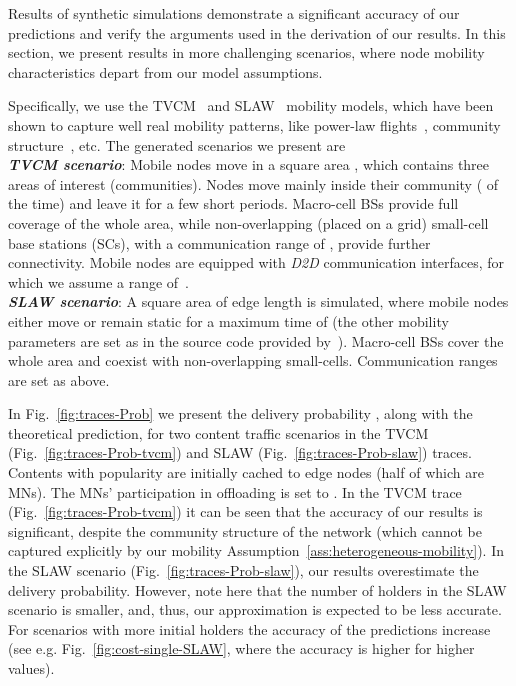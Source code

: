 \documentclass[10pt,conference,letterpaper]{IEEEtran}
\begin{document}
Results of synthetic simulations demonstrate a significant accuracy of our predictions and verify the arguments used in the derivation of our results. In this section, we present results in more challenging scenarios, where node mobility characteristics depart from our model assumptions.

Specifically, we use the TVCM~\cite{tvcm} and SLAW~\cite{slaw} mobility models, which have been shown to capture well real mobility patterns, like power-law flights~\cite{slaw}, community structure~\cite{tvcm}, etc. The generated scenarios we present are\\
\noindent\textit{\textbf{TVCM scenario}}: Mobile nodes move in a square area , which contains three areas of interest (communities). Nodes move mainly inside their community ( of the time) and leave it for a few short periods. Macro-cell BSs provide full coverage of the whole area, while  non-overlapping (placed on a grid) small-cell base stations (SCs), with a communication range of , provide further connectivity. Mobile nodes are equipped with \textit{D2D} communication interfaces, for which we assume a range of~.\\
\textit{\textbf{SLAW scenario}}: A square area of edge length  is simulated, where mobile nodes either move or remain static for a maximum time of  (the other mobility parameters are set as in the source code provided by~\cite{slaw}). Macro-cell BSs cover the whole area and coexist with  non-overlapping small-cells. Communication ranges are set as above.




In Fig.~\ref{fig:traces-Prob} we present the delivery probability , along with the theoretical prediction, for two content traffic scenarios in the TVCM (Fig.~\ref{fig:traces-Prob-tvcm}) and SLAW (Fig.~\ref{fig:traces-Prob-slaw}) traces. Contents with popularity  are initially cached to  edge nodes (half of which are MNs). The MNs' participation in offloading is set to . In the TVCM trace (Fig.~\ref{fig:traces-Prob-tvcm}) it can be seen that the accuracy of our results is significant, despite the community structure of the network (which cannot be captured explicitly by our mobility Assumption~\ref{ass:heterogeneous-mobility}). In the SLAW scenario (Fig.~\ref{fig:traces-Prob-slaw}), our results overestimate the delivery probability. However, note here that the number of holders in the SLAW scenario is smaller, and, thus, our approximation is expected to be less accurate. For scenarios with more initial holders the accuracy of the predictions increase (see e.g. Fig.~\ref{fig:cost-single-SLAW}, where the accuracy is higher for higher  values). 
\end{document}
